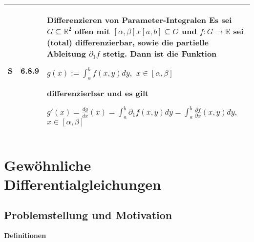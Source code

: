 \begin{longtable}{p{0.75cm} p{1cm} p{16cm}}
        \midrule
        S   & 6.8.9 &   \textbf{Differenzieren von Parameter-Integralen} \hfill \break
                        Es sei $G \subseteq \mathbb{R}^2$ offen mit $[\alpha, \beta] x [a,b] \subseteq G$ und $f: G \rightarrow \mathbb{R}$ sei 
                        (total) differenzierbar, sowie die partielle Ableitung $\partial_1 f$ stetig. Dann ist die Funktion \hfill \break
                        \centerline{$ g(x) := \int_a^b f(x,y) dy,$ $x \in [\alpha, \beta] $}
                        differenzierbar und es gilt \hfill \break
                        \centerline{$ g'(x) = \frac{dg}{dx}(x) = \int_a^b \partial_1 f(x,y) dy = \int_a^b \frac{\partial f}{\partial x}(x,y)dy,$
                        $x \in [\alpha, \beta]$} \\

        \bottomrule
    \end{longtable}

\section{Gewöhnliche Differentialgleichungen}
\subsection{Problemstellung und Motivation}

    \noindent
    \textbf{Definitionen}
      
